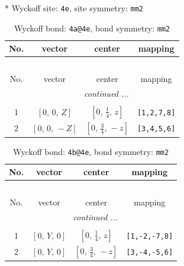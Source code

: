 \documentclass[fleqn,8pt]{jsarticle}
\begin{document}
* Wyckoff site: {\tt 4e}, site symmetry: {\tt mm2}
\renewcommand{\arraystretch}{1.2}
\begin{longtable}{cccc}
\caption{Wyckoff bond: {\tt 4a@4e}, bond symmetry: {\tt mm2}}
 \\
 \hline \hline
No. & vector & center & mapping \\ \hline \endfirsthead

\multicolumn{3}{l}{\tablename\ \thetable{}} \\
 \hline \hline
No. & vector & center & mapping \\ \hline \endhead

 \hline \hline
\multicolumn{3}{r}{\footnotesize\it continued ...} \\ \endfoot

 \hline \hline
\multicolumn{3}{r}{} \\ \endlastfoot

1 & $\left[ 0,\, 0,\, Z \right]$ & $\left[ 0,\, \frac{1}{4},\, z \right]$ & {\tt [1,2,7,8]} \\ \hline
2 & $\left[ 0,\, 0,\, - Z \right]$ & $\left[ 0,\, \frac{3}{4},\, - z \right]$ & {\tt [3,4,5,6]} \\
\end{longtable}
\renewcommand{\arraystretch}{1.2}
\begin{longtable}{cccc}
\caption{Wyckoff bond: {\tt 4b@4e}, bond symmetry: {\tt mm2}}
 \\
 \hline \hline
No. & vector & center & mapping \\ \hline \endfirsthead

\multicolumn{3}{l}{\tablename\ \thetable{}} \\
 \hline \hline
No. & vector & center & mapping \\ \hline \endhead

 \hline \hline
\multicolumn{3}{r}{\footnotesize\it continued ...} \\ \endfoot

 \hline \hline
\multicolumn{3}{r}{} \\ \endlastfoot

1 & $\left[ 0,\, Y,\, 0 \right]$ & $\left[ 0,\, \frac{1}{4},\, z \right]$ & {\tt [1,-2,-7,8]} \\ \hline
2 & $\left[ 0,\, Y,\, 0 \right]$ & $\left[ 0,\, \frac{3}{4},\, - z \right]$ & {\tt [3,-4,-5,6]} \\
\end{longtable}
\renewcommand{\arraystretch}{1.2}
\end{document}
